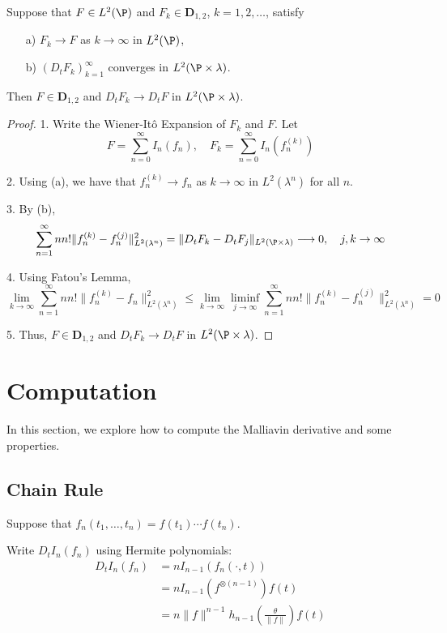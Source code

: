 \begin{theorem}\label{thm:closability-malliavin}
Suppose that $F \in L^2(\P)$ and $F_k \in \mathbf{D}_{1,2}$, $k = 1, 2, \ldots$, satisfy

\begin{enumerate}
	\item[a)] $F_k \to F$ as $k \to \infty$ in $L^2(\P)$, 
	\item[b)] $(D_t F_k)_{k=1}^\infty$ converges in $L^2(\P \times \lambda)$.
\end{enumerate}

Then $F \in \mathbf{D}_{1,2}$ and $D_t F_k \to D_t F$ in $L^2(\P \times \lambda)$.
\end{theorem}

\begin{proof} 
1. Write the Wiener-Itô Expansion of $F_k$ and $F$. Let
$$
F = \sum_{n=0}^\infty I_n(f_n), \quad F_k = \sum_{n=0}^\infty I_n(f_n^{(k)})
$$

2. Using (a), we have that $f_n^{(k)} \to f_n$ as $k \to \infty$ in $L^2(\lambda^n)$ for all $n$.

3. By (b), 
$$
\sum_{n=1}^\infty n n! \| f_n^{(k)} - f_n^{(j)} \|_{L^2(\lambda^n)}^2 = \| D_t F_k - D_t F_j \|_{L^2(\P \times \lambda)} \longrightarrow 0, \quad j,k \to \infty
$$

4. Using Fatou's Lemma,
$$
\lim_{k \to \infty} \sum_{n=1}^\infty n n! \| f_n^{(k)} - f_n \|_{L^2(\lambda^n)}^2 \le \lim_{k \to \infty} \liminf_{j \to \infty} \sum_{n=1}^\infty n n! \| f_n^{(k)} - f_n^{(j)} \|_{L^2(\lambda^n)}^2 = 0 
$$

5. Thus, $F \in \mathbf{D}_{1,2}$ and $D_t F_k \to D_t F$ in $L^2(\P \times \lambda)$.
\end{proof}

\section{Computation} 

In this section, we explore how to compute the Malliavin derivative and some properties.  

\subsection{Chain Rule}\label{subsec:chain-rule}

Suppose that $f_n(t_1, \ldots, t_n) = f(t_1) \cdots f(t_n)$.

Write $D_t I_n(f_n)$ using Hermite polynomials:
\begin{equation*}
\begin{aligned}
	D_t I_n(f_n) &= n I_{n-1}(f_n(\cdot, t)) \\
		     &= n I_{n-1}(f^{\otimes (n-1)})f(t) \\
		     &= n \| f \|^{n-1} h_{n-1} \left( \frac{\theta}{\| f \|} \right) f(t)
\end{aligned}
\end{equation*}

